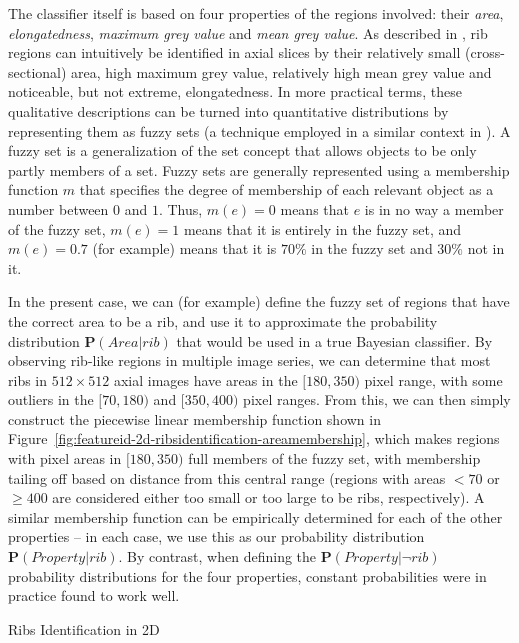 \noindent The classifier itself is based on four properties of the regions involved: their \emph{area}, \emph{elongatedness}, \emph{maximum grey value} and \emph{mean grey value}. As described in \cite{gvccimi08}, rib regions can intuitively be identified in axial slices by their relatively small (cross-sectional) area, high maximum grey value, relatively high mean grey value and noticeable, but not extreme, elongatedness. In more practical terms, these qualitative descriptions can be turned into quantitative distributions by representing them as fuzzy sets (a technique employed in a similar context in \cite{lee03}). A fuzzy set is a generalization of the set concept that allows objects to be only partly members of a set. Fuzzy sets are generally represented using a membership function $m$ that specifies the degree of membership of each relevant object as a number between $0$ and $1$. Thus, $m(e) = 0$ means that $e$ is in no way a member of the fuzzy set, $m(e) = 1$ means that it is entirely in the fuzzy set, and $m(e) = 0.7$ (for example) means that it is $70\%$ in the fuzzy set and $30\%$ not in it.

In the present case, we can (for example) define the fuzzy set of regions that have the correct area to be a rib, and use it to approximate the probability distribution $\mathbf{P}(\mathit{Area} | \mathit{rib})$ that would be used in a true Bayesian classifier. By observing rib-like regions in multiple image series, we can determine that most ribs in $512 \times 512$ axial images have areas in the $[180,350)$ pixel range, with some outliers in the $[70,180)$ and $[350,400)$ pixel ranges. From this, we can then simply construct the piecewise linear membership function shown in Figure~\ref{fig:featureid-2d-ribsidentification-areamembership}, which makes regions with pixel areas in $[180,350)$ full members of the fuzzy set, with membership tailing off based on distance from this central range (regions with areas $< 70$ or $\ge 400$ are considered either too small or too large to be ribs, respectively). A similar membership function can be empirically determined for each of the other properties -- in each case, we use this as our probability distribution $\mathbf{P}(\mathit{Property} | \mathit{rib})$. By contrast, when defining the $\mathbf{P}(\mathit{Property} | \neg\mathit{rib})$ probability distributions for the four properties, constant probabilities were in practice found to work well.

\begin{stulisting}[p]
\caption{Ribs Identification in 2D}
\label{code:featureid-2d-ribsidentification}

\end{stulisting}

